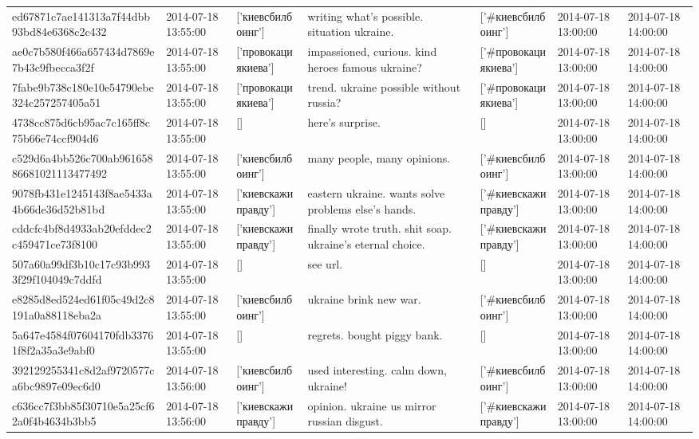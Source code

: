 \begin{tabular}{lllllll}
ed67871c7ae141313a7f44dbb93bd84e6368c2c432 & 2014-07-18 13:55:00 & ['киевсбилбоинг'] & writing what's possible. situation ukraine. & ['#киевсбилбоинг'] & 2014-07-18 13:00:00 & 2014-07-18 14:00:00 \\
ae0c7b580f466a657434d7869e7b43c9fbecca3f2f & 2014-07-18 13:55:00 & ['провокациякиева'] & impassioned, curious. kind heroes famous ukraine? & ['#провокациякиева'] & 2014-07-18 13:00:00 & 2014-07-18 14:00:00 \\
7fabe9b738c180e10e54790ebe324c257257405a51 & 2014-07-18 13:55:00 & ['провокациякиева'] & trend. ukraine possible without russia? & ['#провокациякиева'] & 2014-07-18 13:00:00 & 2014-07-18 14:00:00 \\
4738cc875d6cb95ac7c165ff8c75b66e74ccf904d6 & 2014-07-18 13:55:00 & [] & here's surprise. & [] & 2014-07-18 13:00:00 & 2014-07-18 14:00:00 \\
c529d6a4bb526c700ab96165886681021113477492 & 2014-07-18 13:55:00 & ['киевсбилбоинг'] & many people, many opinions. & ['#киевсбилбоинг'] & 2014-07-18 13:00:00 & 2014-07-18 14:00:00 \\
9078fb431e1245143f8ae5433a4b66de36d52b81bd & 2014-07-18 13:55:00 & ['киевскажиправду'] & eastern ukraine. wants solve problems else's hands. & ['#киевскажиправду'] & 2014-07-18 13:00:00 & 2014-07-18 14:00:00 \\
cddcfc4bf8d4933ab20efddec2c459471ce73f8100 & 2014-07-18 13:55:00 & ['киевскажиправду'] & finally wrote truth. shit soap. ukraine's eternal choice. & ['#киевскажиправду'] & 2014-07-18 13:00:00 & 2014-07-18 14:00:00 \\
507a60a99df3b10c17c93b9933f29f104049c7ddfd & 2014-07-18 13:55:00 & [] & see url. & [] & 2014-07-18 13:00:00 & 2014-07-18 14:00:00 \\
e8285d8ed524ed61f05c49d2c8191a0a88118eba2a & 2014-07-18 13:55:00 & ['киевсбилбоинг'] & ukraine brink new war. & ['#киевсбилбоинг'] & 2014-07-18 13:00:00 & 2014-07-18 14:00:00 \\
5a647e4584f07604170fdb33761f8f2a35a3e9abf0 & 2014-07-18 13:55:00 & [] & regrets. bought piggy bank. & [] & 2014-07-18 13:00:00 & 2014-07-18 14:00:00 \\
392129255341c8d2af9720577ca6bc9897e09ec6d0 & 2014-07-18 13:56:00 & ['киевсбилбоинг'] & used interesting. calm down, ukraine! & ['#киевсбилбоинг'] & 2014-07-18 13:00:00 & 2014-07-18 14:00:00 \\
c636cc7f3bb85f30710e5a25cf62a0f4b4634b3bb5 & 2014-07-18 13:56:00 & ['киевскажиправду'] & opinion. ukraine us mirror russian disgust. & ['#киевскажиправду'] & 2014-07-18 13:00:00 & 2014-07-18 14:00:00 \\

\end{tabular}
